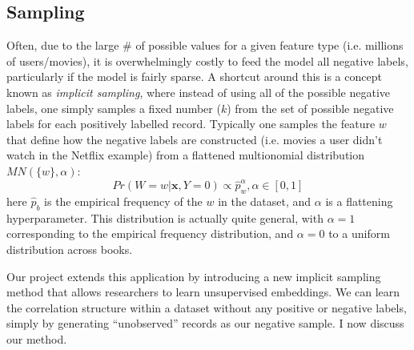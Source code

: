 \documentclass{article} %
\begin{document}
\subsection{Sampling}



Often, due to the large \# of possible values for a given feature type (i.e. millions of users/movies), it is overwhelmingly costly to feed the model all negative labels, particularly if the model is fairly sparse. A shortcut around this is a concept known as \textit{implicit sampling}, where instead of using all of the possible negative labels, one simply samples a fixed number ($k$) from the set of possible negative labels for each positively labelled record. Typically one samples the feature $w$ that define how the negative labels are constructed (i.e. movies a user didn't watch in the Netflix example) from a flattened multionomial distribution $MN(\{w\},\alpha)$: 
\[Pr(W=w|\mathbf{x},Y=0)  \propto \hat p_w^\alpha,\alpha \in [0,1] \] 
here $\hat p_b$  is the empirical frequency of the $w$ in the dataset, and $\alpha$ is a flattening hyperparameter. This distribution is actually quite general, with $\alpha=1$ corresponding to the empirical frequency distribution, and $\alpha=0$ to a uniform distribution across books.


Our project extends this application by introducing a new implicit sampling method that allows researchers to learn unsupervised embeddings. We can learn the correlation structure within a dataset without any positive or negative labels, simply by generating ``unobserved'' records as our negative sample. I now discuss our method.
\end{document}
